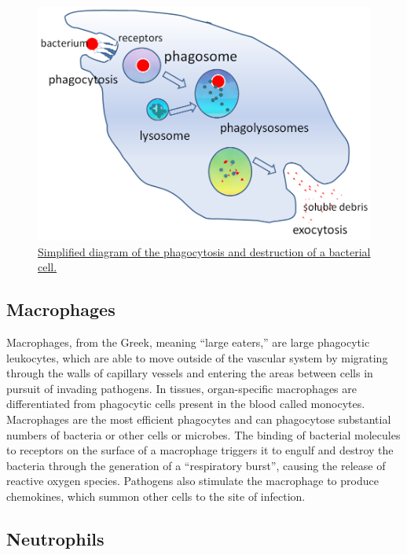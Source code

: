 \begin{figure}

{\centering \includegraphics[width=0.7\linewidth]{./figures/immune/Phagocytosis2} 

}

\caption{\href{https://commons.wikimedia.org/wiki/File:Phagocytosis2.png}{Simplified diagram of the phagocytosis and destruction of a bacterial cell.}}\label{fig:phagocytosisdiagram}
\end{figure}

\hypertarget{macrophages}{%
\subsection{Macrophages}\label{macrophages}}

Macrophages, from the Greek, meaning ``large eaters,'' are large phagocytic leukocytes, which are able to move outside of the vascular system by migrating through the walls of capillary vessels and entering the areas between cells in pursuit of invading pathogens. In tissues, organ-specific macrophages are differentiated from phagocytic cells present in the blood called monocytes. Macrophages are the most efficient phagocytes and can phagocytose substantial numbers of bacteria or other cells or microbes. The binding of bacterial molecules to receptors on the surface of a macrophage triggers it to engulf and destroy the bacteria through the generation of a ``respiratory burst'', causing the release of reactive oxygen species. Pathogens also stimulate the macrophage to produce chemokines, which summon other cells to the site of infection.

\hypertarget{neutrophils}{%
\subsection{Neutrophils}\label{neutrophils}}

